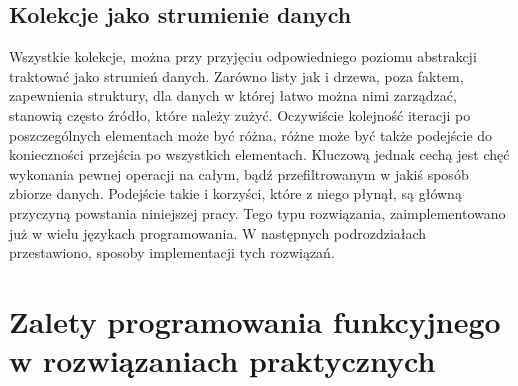 \documentclass[a4paper,10pt]{report}
\begin{document}
\section{Kolekcje jako strumienie danych}
Wszystkie kolekcje, można przy przyjęciu odpowiedniego poziomu abstrakcji traktować jako strumień danych. Zarówno listy jak i drzewa, poza faktem, zapewnienia struktury, dla danych w której łatwo można nimi zarządzać, stanowią często źródło, które należy zużyć. Oczywiście kolejność iteracji po poszczególnych elementach może być różna, różne może być także podejście do konieczności przejścia po wszystkich elementach. Kluczową jednak cechą jest chęć wykonania pewnej operacji na całym, bądź przefiltrowanym w jakiś sposób zbiorze danych. Podejście takie i korzyści, które z niego płynął, są główną przyczyną powstania niniejszej pracy. Tego typu rozwiązania, zaimplementowano już w wielu językach programowania. W następnych podrozdziałach przestawiono, sposoby implementacji tych rozwiązań.
\chapter{Zalety programowania funkcyjnego w rozwiązaniach praktycznych}
\end{document}
